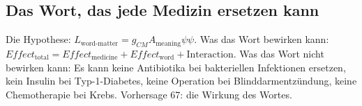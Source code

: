 \subsection{Das Wort, das jede Medizin ersetzen kann}
Die Hypothese: $L_{\text{word-matter}} = g_{CM} A_{\text{meaning}} \psi \psi$. Was das Wort bewirken kann: $Effect_{\text{total}} = Effect_{\text{medicine}} + Effect_{\text{word}} + \text{Interaction}$. Was das Wort nicht bewirken kann: Es kann keine Antibiotika bei bakteriellen Infektionen ersetzen, kein Insulin bei Typ-1-Diabetes, keine Operation bei Blinddarmentzündung, keine Chemotherapie bei Krebs. Vorhersage 67: die Wirkung des Wortes.

\newpage
